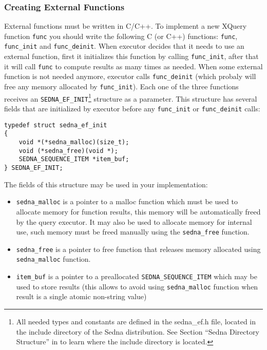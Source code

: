 \documentclass[a4paper,12pt]{article}
\begin{document}
\subsubsection*{Creating External Functions}
External functions must be written in C/C++. To implement a new XQuery function
\verb!func! you should write the following C (or C++) functions: \verb!func!,
\verb!func_init! and \verb!func_deinit!. When executor decides that it needs to
use an external function, first it initializes this function by calling
\verb!func_init!, after that it will call \verb!func! to compute results as many
times as needed. When some external function is not needed anymore, executor
calls \verb!func_deinit! (which probaly will free any memory allocated by
\verb!func_init!). Each one of the three functions receives an
\verb!SEDNA_EF_INIT!\footnote{All needed types and constants are defined in the
sedna\_ef.h file, located in the include directory of the Sedna distribution.
See Section ``Sedna Directory Structure'' in \cite{doc:admin} to learn where the
include directory is located.} structure as a parameter. This structure has
several fields that are initialized by executor before any \verb!func_init! or
\verb!func_deinit! calls:
\begin{verbatim}
typedef struct sedna_ef_init
{
    void *(*sedna_malloc)(size_t);
    void (*sedna_free)(void *);
    SEDNA_SEQUENCE_ITEM *item_buf;
} SEDNA_EF_INIT;
\end{verbatim}
The fields of this structure may be used in your implementation:
\begin{itemize}
\item \verb!sedna_malloc! is a pointer to a malloc function which must be used
to allocate memory for function results, this memory will be automatically freed
by the query executor. It may also be used to allocate memory for internal use,
such memory must be freed manually using the \verb!sedna_free! function.
\item \verb!sedna_free! is a pointer to free function that releases memory
allocated using \verb!sedna_malloc! function.
\item \verb!item_buf! is a pointer to a preallocated \verb!SEDNA_SEQUENCE_ITEM!
which may be used to store results (this allows to avoid using
\verb!sedna_malloc! function when result is a single atomic non-string value)
\end{itemize}
\end{document}
